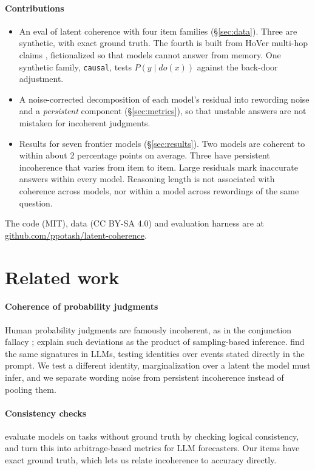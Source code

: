 \documentclass[11pt]{article}
\begin{document}
\paragraph{Contributions}
\begin{itemize}
\item An eval of latent coherence with four item families (\S\ref{sec:data}). Three are synthetic, with exact ground truth. The fourth is built from HoVer multi-hop claims \citep{jiang2020hover}, fictionalized so that models cannot answer from memory. One synthetic family, \texttt{causal}, tests $P(y\mid do(x))$ against the back-door adjustment.
\item A noise-corrected decomposition of each model's residual into rewording noise and a \emph{persistent} component (\S\ref{sec:metrics}), so that unstable answers are not mistaken for incoherent judgments.
\item Results for seven frontier models (\S\ref{sec:results}). Two models are coherent to within about 2 percentage points on average. Three have persistent incoherence that varies from item to item. Large residuals mark inaccurate answers within every model. Reasoning length is not associated with coherence across models, nor within a model across rewordings of the same question.
\end{itemize}
The code (MIT), data (CC BY-SA 4.0) and evaluation harness are at \href{https://github.com/ppotash/latent-coherence}{github.com/ppotash/latent-coherence}.

\section{Related work}

\paragraph{Coherence of probability judgments} Human probability judgments are famously incoherent, as in the conjunction fallacy \citep{tversky1983extensional}; \citet{zhu2020bayesian} explain such deviations as the product of sampling-based inference. \citet{zhu2024incoherent} find the same signatures in LLMs, testing identities over events stated directly in the prompt. We test a different identity, marginalization over a latent the model must infer, and we separate wording noise from persistent incoherence instead of pooling them.

\paragraph{Consistency checks} \citet{fluri2023evaluating} evaluate models on tasks without ground truth by checking logical consistency, and \citet{paleka2025consistency} turn this into arbitrage-based metrics for LLM forecasters. Our items have exact ground truth, which lets us relate incoherence to accuracy directly.
\end{document}
